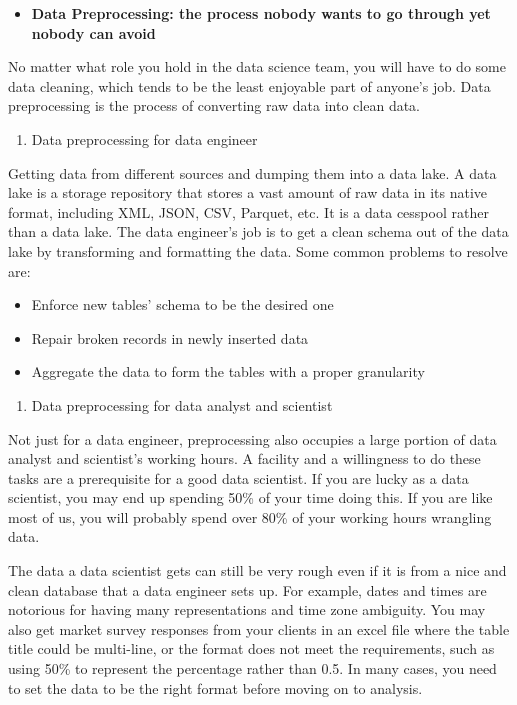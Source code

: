 \documentclass[
  12pt,
]{krantz}
\providecommand{\tightlist}{%
  \setlength{\itemsep}{0pt}\setlength{\parskip}{0pt}}
\begin{document}
\begin{itemize}
\tightlist
\item
  \textbf{Data Preprocessing: the process nobody wants to go through yet nobody can avoid}
\end{itemize}

No matter what role you hold in the data science team, you will have to do some data cleaning, which tends to be the least enjoyable part of anyone's job. Data preprocessing is the process of converting raw data into clean data.

\begin{enumerate}
\def\labelenumi{(\arabic{enumi})}
\tightlist
\item
  Data preprocessing for data engineer
\end{enumerate}

Getting data from different sources and dumping them into a data lake. A data lake is a storage repository that stores a vast amount of raw data in its native format, including XML, JSON, CSV, Parquet, etc. It is a data cesspool rather than a data lake. The data engineer's job is to get a clean schema out of the data lake by transforming and formatting the data. Some common problems to resolve are:

\begin{itemize}
\tightlist
\item
  Enforce new tables' schema to be the desired one
\item
  Repair broken records in newly inserted data
\item
  Aggregate the data to form the tables with a proper granularity
\end{itemize}

\begin{enumerate}
\def\labelenumi{(\arabic{enumi})}
\setcounter{enumi}{1}
\tightlist
\item
  Data preprocessing for data analyst and scientist
\end{enumerate}

Not just for a data engineer, preprocessing also occupies a large portion of data analyst and scientist's working hours. A facility and a willingness to do these tasks are a prerequisite for a good data scientist. If you are lucky as a data scientist, you may end up spending 50\% of your time doing this. If you are like most of us, you will probably spend over 80\% of your working hours wrangling data.

The data a data scientist gets can still be very rough even if it is from a nice and clean database that a data engineer sets up. For example, dates and times are notorious for having many representations and time zone ambiguity. You may also get market survey responses from your clients in an excel file where the table title could be multi-line, or the format does not meet the requirements, such as using 50\% to represent the percentage rather than 0.5. In many cases, you need to set the data to be the right format before moving on to analysis.
\end{document}

